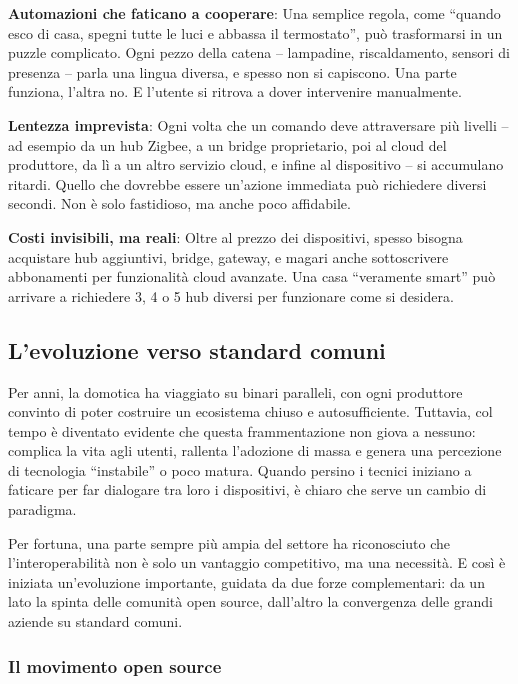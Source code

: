 \textbf{Automazioni che faticano a cooperare}: Una semplice regola, come “quando esco di casa, spegni tutte le luci e abbassa il termostato”, può trasformarsi in un puzzle complicato. Ogni pezzo della catena – lampadine, riscaldamento, sensori di presenza – parla una lingua diversa, e spesso non si capiscono. Una parte funziona, l’altra no. E l’utente si ritrova a dover intervenire manualmente.

\textbf{Lentezza imprevista}: Ogni volta che un comando deve attraversare più livelli – ad esempio da un hub Zigbee, a un bridge proprietario, poi al cloud del produttore, da lì a un altro servizio cloud, e infine al dispositivo – si accumulano ritardi. Quello che dovrebbe essere un’azione immediata può richiedere diversi secondi. Non è solo fastidioso, ma anche poco affidabile.

\textbf{Costi invisibili, ma reali}: Oltre al prezzo dei dispositivi, spesso bisogna acquistare hub aggiuntivi, bridge, gateway, e magari anche sottoscrivere abbonamenti per funzionalità cloud avanzate. Una casa “veramente smart” può arrivare a richiedere 3, 4 o 5 hub diversi per funzionare come si desidera.

\subsection{L'evoluzione verso standard comuni}

Per anni, la domotica ha viaggiato su binari paralleli, con ogni produttore convinto di poter costruire un ecosistema chiuso e autosufficiente. Tuttavia, col tempo è diventato evidente che questa frammentazione non giova a nessuno: complica la vita agli utenti, rallenta l’adozione di massa e genera una percezione di tecnologia “instabile” o poco matura. Quando persino i tecnici iniziano a faticare per far dialogare tra loro i dispositivi, è chiaro che serve un cambio di paradigma.

Per fortuna, una parte sempre più ampia del settore ha riconosciuto che l’interoperabilità non è solo un vantaggio competitivo, ma una necessità. E così è iniziata un’evoluzione importante, guidata da due forze complementari: da un lato la spinta delle comunità open source, dall’altro la convergenza delle grandi aziende su standard comuni.

\subsubsection{Il movimento open source}

